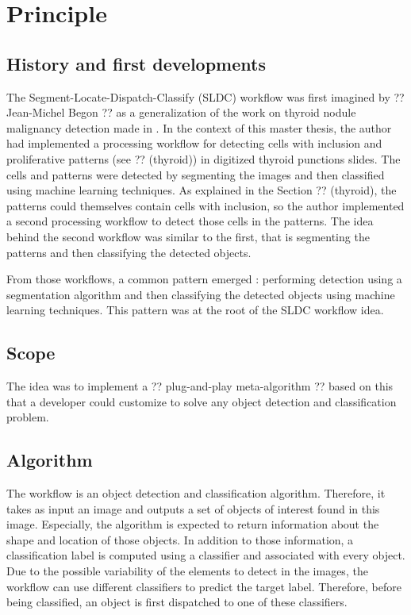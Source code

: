 \section{Principle}
\subsection{History and first developments}
The Segment-Locate-Dispatch-Classify (SLDC) workflow was first imagined by ?? Jean-Michel Begon ?? as a generalization of the work on thyroid nodule malignancy detection made in \cite{adeblire2013}. In the context of this master thesis, the author had implemented a processing workflow for detecting cells with inclusion and proliferative patterns (see ?? (thyroid)) in digitized thyroid punctions slides. The cells and patterns were detected by segmenting the images and then classified using machine learning techniques. As explained in the Section ?? (thyroid), the patterns could themselves contain cells with inclusion, so the author implemented a second processing workflow to detect those cells in the patterns. The idea behind the second workflow was similar to the first, that is segmenting the patterns and then classifying the detected objects. 

From those workflows, a common pattern emerged : performing detection using a segmentation algorithm and then classifying the detected objects using machine learning techniques. This pattern was at the root of the SLDC workflow idea. 

\subsection{Scope}
The idea was to implement a ?? plug-and-play meta-algorithm ?? based on this that a developer could customize to solve any object detection and classification problem.  

\subsection{Algorithm}
The workflow is an object detection and classification algorithm. Therefore, it takes as input an image and outputs a set of objects of interest found in this image. Especially, the algorithm is expected to return information about the shape and location of those objects. In addition to those information, a classification label is computed using a classifier and associated with every object. Due to the possible variability of the elements to detect in the images, the workflow can use different classifiers to predict the target label. Therefore, before being classified, an object is first dispatched to one of these classifiers. 

